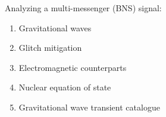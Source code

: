 \def\x{1mm}
\def\y{3mm}
Analyzing a multi-messenger \textbf{} (BNS) signal:
\begin{enumerate}
  \item Gravitational waves

  \vspace{\x}

  \item Glitch mitigation
  
  \vspace{\x}
  
  \item Electromagnetic counterparts
  
  \vspace{\x}
  
  \item Nuclear equation of state
  
  \vspace{\x}
  
  \item Gravitational wave transient catalogue
\end{enumerate}

\vspace{\y}

\centering
{}